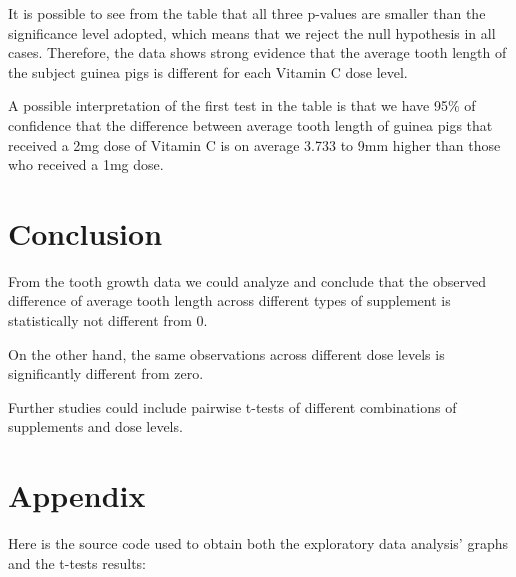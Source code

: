 \documentclass[a4paper]{article}
\begin{document}
It is possible to see from the table that all three p-values are smaller than the significance level adopted, which means that we reject the null hypothesis in all cases. Therefore, the data shows strong evidence that the average tooth length of the subject guinea pigs is different for each Vitamin C dose level. 

A possible interpretation of the first test in the table is that we have 95\% of confidence that the difference between average tooth length of guinea pigs that received a 2mg dose of Vitamin C is on average 3.733 to 9mm higher than those who received a 1mg dose.

\section*{Conclusion}

From the tooth growth data we could analyze and conclude that the observed difference of average tooth length across different types of supplement is statistically not different from 0.

On the other hand, the same observations across different dose levels is significantly different from zero.

Further studies could include pairwise t-tests of different combinations of supplements and dose levels.

\newpage

\section*{Appendix}

Here is the source code used to obtain both the exploratory data analysis' graphs and the t-tests results:
\end{document}
